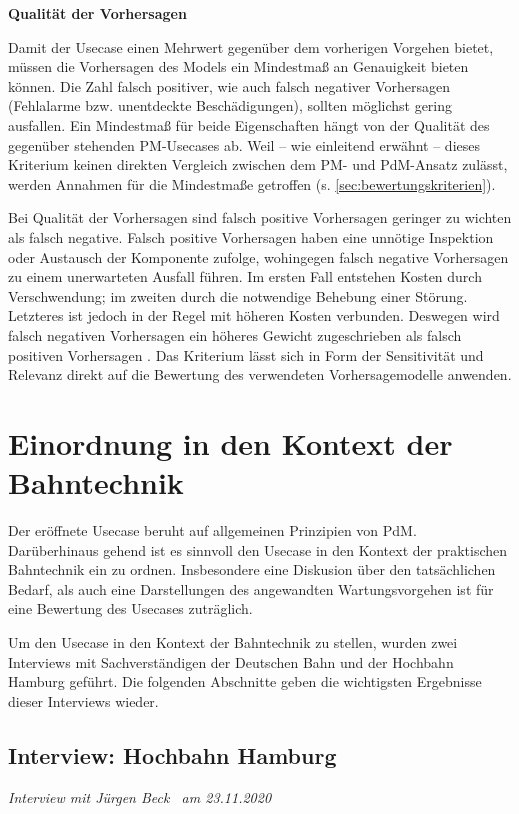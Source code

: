 \textbf{Qualität der Vorhersagen}

Damit der Usecase einen Mehrwert gegenüber dem vorherigen Vorgehen bietet, müssen die Vorhersagen des Models ein Mindestmaß an Genauigkeit bieten können. Die Zahl falsch positiver, wie auch falsch negativer Vorhersagen (Fehlalarme bzw. unentdeckte Beschädigungen), sollten möglichst gering ausfallen. Ein Mindestmaß für beide Eigenschaften hängt von der Qualität des gegenüber stehenden PM-Usecases ab. Weil -- wie einleitend erwähnt -- dieses Kriterium keinen direkten Vergleich zwischen dem PM- und PdM-Ansatz zulässt, werden Annahmen für die Mindestmaße getroffen (s. \cref{sec:bewertungskriterien}).

Bei Qualität der Vorhersagen sind falsch positive Vorhersagen geringer zu wichten als falsch negative. Falsch positive Vorhersagen haben eine unnötige Inspektion oder Austausch der Komponente zufolge, wohingegen falsch negative Vorhersagen zu einem unerwarteten Ausfall führen. Im ersten Fall entstehen Kosten durch Verschwendung; im zweiten durch die notwendige Behebung einer Störung. Letzteres ist jedoch in der Regel mit höheren Kosten verbunden. Deswegen wird falsch negativen Vorhersagen ein höheres Gewicht zugeschrieben als falsch positiven Vorhersagen . 
Das Kriterium lässt sich in Form der Sensitivität und Relevanz direkt auf die Bewertung des verwendeten Vorhersagemodelle anwenden.
\section{Einordnung in den Kontext der Bahntechnik}
\label{sec:kontext_bahntechnik_von_usecase}
Der eröffnete Usecase beruht auf allgemeinen Prinzipien von PdM. Darüberhinaus gehend ist es sinnvoll den Usecase in den Kontext der praktischen Bahntechnik ein zu ordnen. Insbesondere eine Diskusion über den tatsächlichen Bedarf, als auch eine Darstellungen des angewandten Wartungsvorgehen ist für eine Bewertung des Usecases zuträglich.

Um den Usecase in den Kontext der Bahntechnik zu stellen, wurden zwei Interviews mit Sachverständigen der Deutschen Bahn und der Hochbahn Hamburg geführt. Die folgenden Abschnitte geben die wichtigsten Ergebnisse dieser Interviews wieder.
\subsection{Interview: Hochbahn Hamburg}
\label{subsec:interview_hochbahn}
\textit{Interview mit Jürgen Beck~\cite{hochbahn.23.11.2020} am {23.11.2020}}

